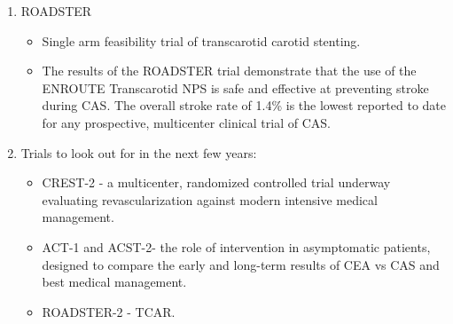 \documentclass[
]{book}
\providecommand{\tightlist}{%
  \setlength{\itemsep}{0pt}\setlength{\parskip}{0pt}}
\begin{document}
\begin{enumerate}
  \begin{itemize}
  \item
    Compared CEA vs.~CAS in both symptomatic and asymptomatic
    patients.
  \item
    Composite endpoint of 30-day stroke, MI, death equivalent
    between CEA and CAS.
  \item
    CAS had a significantly higher incidence of stroke and death
    than CEA and CEA higher incidence of MI.

    \begin{itemize}
    \tightlist
    \item
      Follow up at 10 years demonstrated no difference in
      composite stroke/MI/death but increased rate of stroke/death
      in stented patients likely attributable to increased
      periprocedural stroke. \citep{brottLongTermResultsStenting2016b}
    \end{itemize}
  \item
    Subanalyses identified that older patients (\textgreater70y) had better
    outcomes after CEA than CAS, the QOL impact of stroke was more
    significant than that of MI, and anatomic characteristics of
    carotid lesions (longer, sequential, remote) were predictive of
    increased stroke and death after CAS.
  \item
    Unfortunately, this study provides a benchmark to strive for,
    but no other large trials have achieved these results.
  \end{itemize}
\item
  ROADSTER

  \begin{itemize}
  \item
    Single arm feasibility trial of transcarotid carotid stenting.
  \item
    The results of the ROADSTER trial demonstrate that the use of
    the ENROUTE Transcarotid NPS is safe and effective at preventing
    stroke during CAS. The overall stroke rate of 1.4\% is the lowest
    reported to date for any prospective, multicenter clinical trial
    of CAS.
  \end{itemize}
\item
  Trials to look out for in the next few years:

  \begin{itemize}
  \item
    CREST-2 - a multicenter, randomized controlled trial underway
    evaluating revascularization against modern intensive medical
    management.
  \item
    ACT-1 and ACST-2- the role of intervention in asymptomatic
    patients, designed to compare the early and long-term results of
    CEA vs CAS and best medical management.
  \item
    ROADSTER-2 - TCAR.
  \end{itemize}
\end{enumerate}
\end{document}
